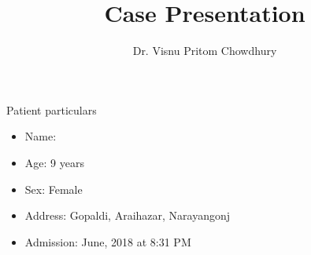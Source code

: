 \documentclass[10pt]{beamer}
\title{Case Presentation}
\date{}
\author{Dr. Visnu Pritom Chowdhury}
\institute{Clinical fellow, NCSD, icddr,b}
\newcommand{\themename}{\textbf{\textsc{metropolis}}\xspace}
\begin{document}
\maketitle



%
%
%
%
%
%


{
\begin{frame}{Patient particulars}
	\begin{itemize}
		\item Name: %
		\item Age: 9 years 
		\item Sex: Female
		\item Address: Gopaldi, Araihazar, Narayangonj
		\item Admission:  June, 2018 at 8:31 PM
	\end{itemize}
\end{frame}
}
\end{document}
